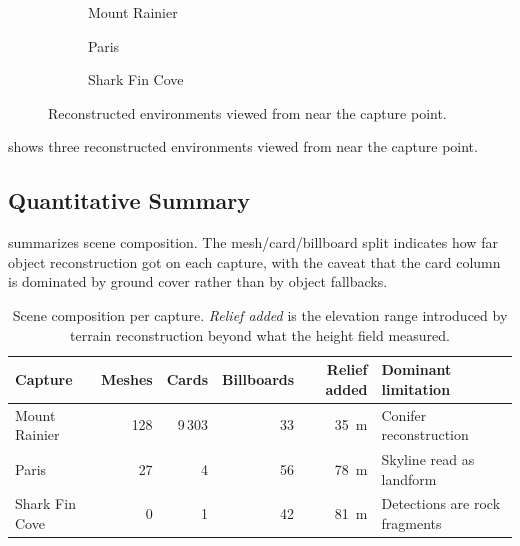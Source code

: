 \begin{figure}[htbp]
  \centering
  \begin{subfigure}{0.5\linewidth}
    \centering
    \caption{Mount Rainier}
  \end{subfigure}

  \vspace{0.9em}
  \begin{subfigure}{0.5\linewidth}
    \centering
    \caption{Paris}
  \end{subfigure}

  \vspace{0.9em}
  \begin{subfigure}{0.5\linewidth}
    \centering
    \caption{Shark Fin Cove}
  \end{subfigure}
  \caption{Reconstructed environments viewed from near the capture point.}
  \label{fig:scenes}
\end{figure}

 shows three reconstructed environments viewed from near the
capture point.

\subsection{Quantitative Summary}

 summarizes scene composition. The mesh/card/billboard split
indicates how far object reconstruction got on each capture, with the caveat that
the card column is dominated by ground cover rather than by object fallbacks.

\begin{table}[t]
\centering
\small
\caption{Scene composition per capture. \emph{Relief added} is the elevation range
introduced by terrain reconstruction beyond what the height field measured.}
\label{tab:results}
\begin{tabular}{@{}lrrrrl@{}}
\toprule
\textbf{Capture} & \textbf{Meshes} & \textbf{Cards} & \textbf{Billboards} &
\textbf{Relief added} & \textbf{Dominant limitation} \\
\midrule
Mount Rainier   & 128 & 9\,303 & 33 & \SI{35}{\meter} & Conifer reconstruction \\
Paris           & 27  & 4      & 56 & \SI{78}{\meter} & Skyline read as landform \\
Shark Fin Cove  & 0   & 1      & 42 & \SI{81}{\meter} & Detections are rock fragments \\
\bottomrule
\end{tabular}
\end{table}


